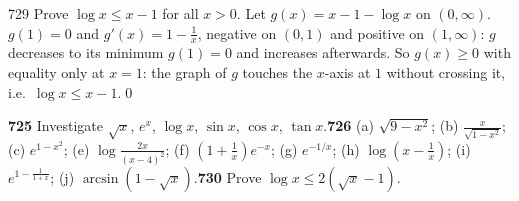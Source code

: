 \begin{bookex}{729}
Prove $\log x\le x-1$ for all $x>0$.
\solution
Let $g(x)=x-1-\log x$ on $(0,\infty)$. $g(1)=0$ and $g'(x)=1-\frac1x$, negative on $(0,1)$ and positive on $(1,\infty)$: $g$ decreases to its minimum $g(1)=0$ and increases afterwards. So $g(x)\ge0$ with equality only at $x=1$: the graph of $g$ touches the $x$-axis at $1$ without crossing it, i.e.\ $\log x\le x-1$.\qed
\end{bookex}

\begin{trybox}[{725, 726(a),(b),(c),(e)--(j), 730}]
\textbf{725} Investigate $\sqrt x$, $e^x$, $\log x$, $\sin x$, $\cos x$, $\tan x$.\quad \textbf{726} (a) $\sqrt{9-x^2}$; (b) $\frac x{\sqrt{1-x^2}}$; (c) $e^{1-x^2}$; (e) $\log\frac{2x}{(x-4)^2}$; (f) $(1+\frac1x)e^{-x}$; (g) $e^{-1/x}$; (h) $\log(x-\frac1x)$; (i) $e^{1-\frac1{1+x}}$; (j) $\arcsin(1-\sqrt x)$.\quad \textbf{730} Prove $\log x\le2(\sqrt x-1)$.
\end{trybox}
